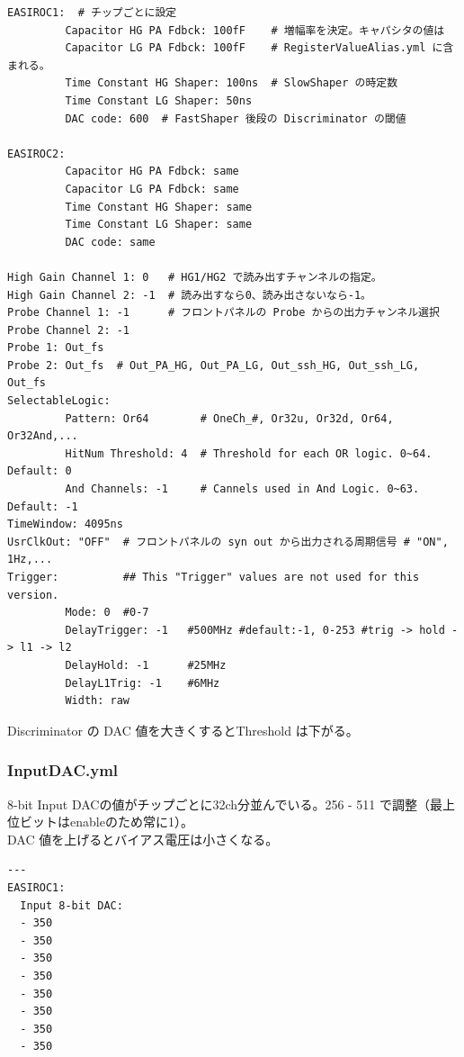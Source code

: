 \documentclass{jsarticle}
\begin{document}
\begin{shadebox}
\begin{verbatim}
EASIROC1:  # チップごとに設定
         Capacitor HG PA Fdbck: 100fF    # 増幅率を決定。キャパシタの値は
         Capacitor LG PA Fdbck: 100fF    # RegisterValueAlias.yml に含まれる。
         Time Constant HG Shaper: 100ns  # SlowShaper の時定数
         Time Constant LG Shaper: 50ns
         DAC code: 600  # FastShaper 後段の Discriminator の閾値
 
EASIROC2:
         Capacitor HG PA Fdbck: same
         Capacitor LG PA Fdbck: same
         Time Constant HG Shaper: same
         Time Constant LG Shaper: same
         DAC code: same
 
High Gain Channel 1: 0   # HG1/HG2 で読み出すチャンネルの指定。
High Gain Channel 2: -1  # 読み出すなら0、読み出さないなら-1。
Probe Channel 1: -1      # フロントパネルの Probe からの出力チャンネル選択
Probe Channel 2: -1
Probe 1: Out_fs
Probe 2: Out_fs  # Out_PA_HG, Out_PA_LG, Out_ssh_HG, Out_ssh_LG, Out_fs
SelectableLogic:
         Pattern: Or64        # OneCh_#, Or32u, Or32d, Or64, Or32And,...
         HitNum Threshold: 4  # Threshold for each OR logic. 0~64. Default: 0
         And Channels: -1     # Cannels used in And Logic. 0~63. Default: -1
TimeWindow: 4095ns
UsrClkOut: "OFF"  # フロントパネルの syn out から出力される周期信号 # "ON", 1Hz,...
Trigger:          ## This "Trigger" values are not used for this version.
         Mode: 0  #0-7
         DelayTrigger: -1   #500MHz #default:-1, 0-253 #trig -> hold -> l1 -> l2
         DelayHold: -1      #25MHz
         DelayL1Trig: -1    #6MHz
         Width: raw
\end{verbatim}
\end{shadebox}
Discriminator の DAC 値を大きくするとThreshold は下がる。

\subsubsection{InputDAC.yml}
8-bit Input DACの値がチップごとに32ch分並んでいる。256 - 511 で調整（最上位ビットはenableのため常に1）。\\
DAC 値を上げるとバイアス電圧は小さくなる。
\begin{shadebox}
\begin{verbatim}
---
EASIROC1:
  Input 8-bit DAC:
  - 350
  - 350
  - 350
  - 350
  - 350
  - 350
  - 350
  - 350
\end{verbatim}
\end{shadebox}
\end{document}

